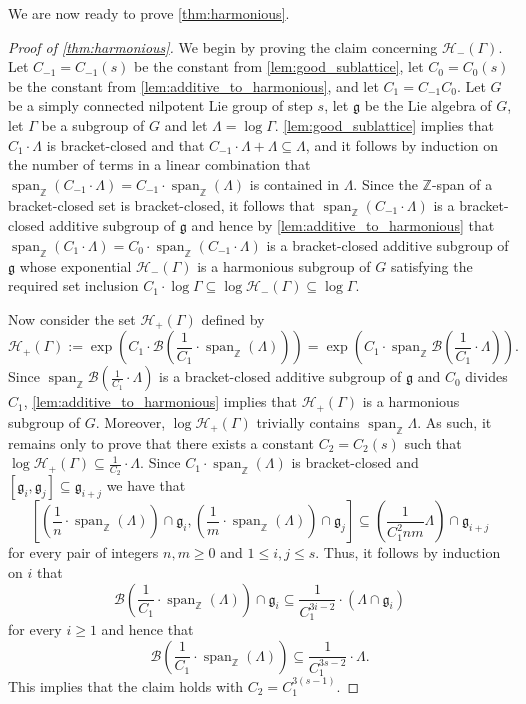 \documentclass[11pt]{article}
\numberwithin{equation}{section}
\theoremstyle{plain}
\theoremstyle{definition}
\theoremstyle{remark}
\numberwithin{equation}{section}
\newcommand{\Z}{\mathbb Z}
\numberwithin{equation}{section}
\newcommand{\spanZ}{\operatorname{span}_\Z}
\begin{document}
We are now ready to prove \cref{thm:harmonious}.

\begin{proof}[Proof of \cref{thm:harmonious}]
We begin by proving the claim concerning $\mathscr{H}_-(\Gamma)$.
 Let $C_{-1}=C_{-1}(s)$ be the constant from \cref{lem:good_sublattice}, let $C_0=C_0(s)$ be the constant from \cref{lem:additive_to_harmonious}, and let $C_1=C_{-1}C_0$.
 Let $G$ be a simply connected nilpotent Lie group of step $s$, let $\mathfrak{g}$ be the Lie algebra of $G$, let $\Gamma$ be a subgroup of $G$ and let $\Lambda = \log \Gamma$.
  \cref{lem:good_sublattice} implies that $C_1 \cdot \Lambda$ is bracket-closed and that $C_{-1}\cdot \Lambda + \Lambda \subseteq \Lambda$, and it follows by induction on the number of terms in a linear combination that $\spanZ(C_{-1}\cdot \Lambda)=C_{-1}\cdot \spanZ(\Lambda)$ is contained in $\Lambda$. 
Since the $\Z$-span of a bracket-closed set is bracket-closed, it follows that $\spanZ(C_{-1} \cdot \Lambda)$ is a bracket-closed additive subgroup of $\mathfrak{g}$ and hence by \cref{lem:additive_to_harmonious} that $\spanZ (C_1 \cdot \Lambda)=C_0\cdot \spanZ(C_{-1}\cdot \Lambda)$ is a bracket-closed additive subgroup of $\mathfrak{g}$ whose exponential $\mathscr{H}_-(\Gamma)$ is a harmonious subgroup of $G$ satisfying the required set inclusion $C_1 \cdot \log \Gamma \subseteq \log \mathscr{H}_-(\Gamma) \subseteq \log \Gamma$.

\medskip

Now consider the set $\mathscr{H}_+(\Gamma)$ defined by
\[\mathscr{H}_+(\Gamma):=\exp\left(C_1 \cdot \mathscr{B}\left(\frac{1}{C_1} \cdot \spanZ (\Lambda)\right)\right)=\exp\left(C_1 \cdot \spanZ \mathscr{B}\left(\frac{1}{C_1} \cdot \Lambda\right)\right).\]
%
 Since $\spanZ \mathscr{B}\left(\frac{1}{C_1} \cdot \Lambda\right)$ is a bracket-closed additive subgroup of $\mathfrak{g}$ and $C_0$ divides $C_1$, \cref{lem:additive_to_harmonious} implies that $\mathscr{H}_+(\Gamma)$ is a harmonious subgroup of $G$. Moreover, $\log \mathscr{H}_+(\Gamma)$ trivially contains $\spanZ \Lambda$. As such, it remains only to prove that there exists a constant $C_2=C_2(s)$ such that $\log \mathscr{H}_+(\Gamma) \subseteq \frac{1}{C_2} \cdot \Lambda$. Since $C_1\cdot \spanZ (\Lambda)$ is bracket-closed
 and $[\mathfrak{g}_i,\mathfrak{g}_j]\subseteq \mathfrak{g}_{i+j}$ we have that
 \[
\left[\left(\frac{1}{n}\cdot \spanZ(\Lambda)\right)\cap \mathfrak{g}_i, \left(\frac{1}{m}\cdot \spanZ(\Lambda)\right)\cap \mathfrak{g}_j\right] \subseteq \left(\frac{1}{C_1^2 nm} \Lambda\right) \cap \mathfrak{g}_{i+j}
 \]
 for every pair of integers $n,m \geq 0$ and $1 \leq i, j \leq s$. Thus, it follows by induction on $i$ that
 \[
\mathscr{B}\left(\frac{1}{C_1} \cdot \spanZ (\Lambda)\right) \cap \mathfrak{g}_i \subseteq \frac{1}{C_1^{3i-2}} \cdot (\Lambda \cap \mathfrak{g}_i)
 \]
for every $i\geq 1$ and hence that
 \[
\mathscr{B}\left(\frac{1}{C_1} \cdot \spanZ (\Lambda)\right) \subseteq \frac{1}{C_1^{3s-2}} \cdot \Lambda.
 \]
 This implies that the claim holds with $C_2=C_1^{3(s-1)}$.
\end{proof}
\end{document}
